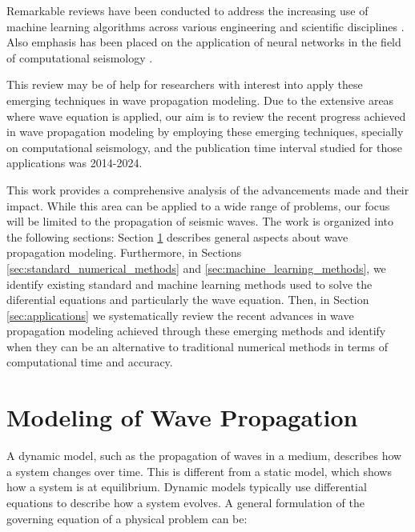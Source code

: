 \documentclass[11pt,twoside]{article}
\begin{document}
Remarkable reviews have been conducted to address the increasing use of machine learning algorithms across various engineering and scientific 
disciplines \citep{vadyala_review_2022,deng_physics-informed_2023,lino_current_2023}. Also emphasis has been placed on the application of
neural networks in the field of computational seismology \citep{jingbo_research_2023}.
 
This review may be of help for researchers with interest into apply these emerging techniques in wave 
propagation modeling. Due to the extensive areas where wave equation is applied, our aim is to review the 
recent progress achieved in wave propagation modeling by employing these emerging techniques, 
specially on computational seismology, and the publication time interval studied for those applications was 2014-2024.

This work provides a comprehensive analysis of the advancements made and their impact. While this area can be applied to a wide range of 
problems, our focus will be limited to the propagation of seismic waves. The work is organized into the following sections: 
Section \ref{sec:modeling_wave_propagation} describes general aspects about wave propagation modeling. Furthermore, in 
Sections \ref{sec:standard_numerical_methods} and \ref{sec:machine_learning_methods}, we identify existing standard and machine 
learning methods used to solve the diferential equations and particularly the wave equation. Then, in Section 
\ref{sec:applications} we systematically review the recent advances in wave propagation modeling achieved through these 
emerging methods and identify when they can be an alternative to traditional numerical methods in terms of computational 
time and accuracy. 

\section{Modeling of Wave Propagation}\label{sec:modeling_wave_propagation}

A dynamic model, such as the propagation of waves in a medium, describes how a system changes over time. This is different from a 
static model, which shows how a system is at equilibrium. Dynamic models typically use differential equations to describe how a 
system evolves. A general formulation of the governing equation of a physical problem can be:
\end{document}
